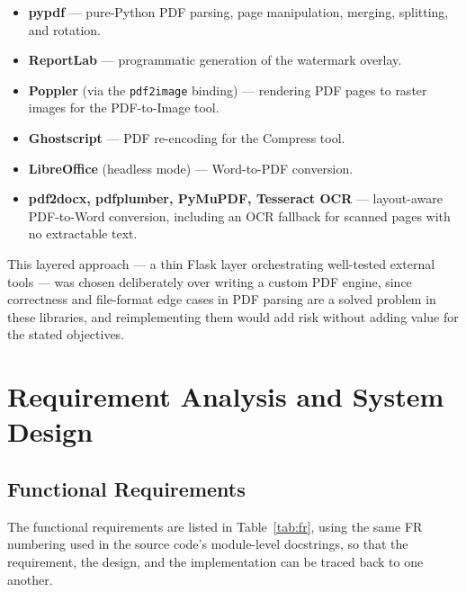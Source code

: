 \documentclass[12pt,a4paper]{report}
\begin{document}
\begin{itemize}
  \item \textbf{pypdf} --- pure-Python PDF parsing, page manipulation, merging, splitting, and
        rotation.
  \item \textbf{ReportLab} --- programmatic generation of the watermark overlay.
  \item \textbf{Poppler} (via the \texttt{pdf2image} binding) --- rendering PDF pages to raster
        images for the PDF-to-Image tool.
  \item \textbf{Ghostscript} --- PDF re-encoding for the Compress tool.
  \item \textbf{LibreOffice} (headless mode) --- Word-to-PDF conversion.
  \item \textbf{pdf2docx, pdfplumber, PyMuPDF, Tesseract OCR} --- layout-aware PDF-to-Word
        conversion, including an OCR fallback for scanned pages with no extractable text.
\end{itemize}

This layered approach --- a thin Flask layer orchestrating well-tested external tools --- was
chosen deliberately over writing a custom PDF engine, since correctness and file-format edge
cases in PDF parsing are a solved problem in these libraries, and reimplementing them would add
risk without adding value for the stated objectives.

\chapter{Requirement Analysis and System Design}

\section{Functional Requirements}
The functional requirements are listed in Table~\ref{tab:fr}, using the same FR numbering used
in the source code's module-level docstrings, so that the requirement, the design, and the
implementation can be traced back to one another.
\end{document}
